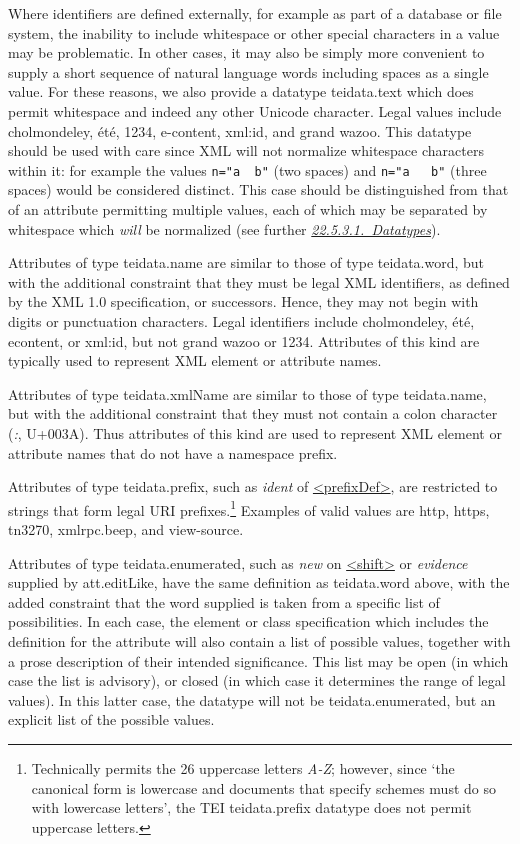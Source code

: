 Where identifiers are defined externally, for example as part of a database or file system, the inability to include whitespace or other special characters in a value may be problematic. In other cases, it may also be simply more convenient to supply a short sequence of natural language words including spaces as a single value. For these reasons, we also provide a datatype \textsf{teidata.text} which does permit whitespace and indeed any other Unicode character. Legal values include cholmondeley, été, 1234, e-content, xml:id, and grand wazoo. This datatype should be used with care since XML will not normalize whitespace characters within it: for example the values \texttt{n="a  b"} (two spaces) and \texttt{n="a   b"} (three spaces) would be considered distinct. This case should be distinguished from that of an attribute permitting multiple values, each of which may be separated by whitespace which \textit{will} be normalized (see further \textit{\hyperref[TD-datatypes]{22.5.3.1.\ Datatypes}}).\par
Attributes of type \textsf{teidata.name} are similar to those of type \textsf{teidata.word}, but with the additional constraint that they must be legal XML identifiers, as defined by the XML 1.0 specification, or successors. Hence, they may not begin with digits or punctuation characters. Legal identifiers include cholmondeley, été, e\textunderscore content, or xml:id, but not grand wazoo or 1234. Attributes of this kind are typically used to represent XML element or attribute names.\par
Attributes of type \textsf{teidata.xmlName} are similar to those of type \textsf{teidata.name}, but with the additional constraint that they must not contain a colon character (\textit{:}, U+003A). Thus attributes of this kind are used to represent XML element or attribute names that do not have a namespace prefix.\par
Attributes of type \textsf{teidata.prefix}, such as {\itshape ident} of \hyperref[TEI.prefixDef]{<prefixDef>}, are restricted to strings that form legal URI prefixes.\footnote{Technically  permits the 26 uppercase letters \textit{A-Z}; however, since ‘the canonical form is lowercase and documents that specify schemes must do so with lowercase letters’, the TEI \textsf{teidata.prefix} datatype does not permit uppercase letters.} Examples of valid values are http, https, tn3270, xmlrpc.beep, and view-source.\par
Attributes of type \textsf{teidata.enumerated}, such as {\itshape new} on \hyperref[TEI.shift]{<shift>} or {\itshape evidence} supplied by \textsf{att.editLike}, have the same definition as \textsf{teidata.word} above, with the added constraint that the word supplied is taken from a specific list of possibilities. In each case, the element or class specification which includes the definition for the attribute will also contain a list of possible values, together with a prose description of their intended significance. This list may be open (in which case the list is advisory), or closed (in which case it determines the range of legal values). In this latter case, the datatype will not be \textsf{teidata.enumerated}, but an explicit list of the possible values.\par
